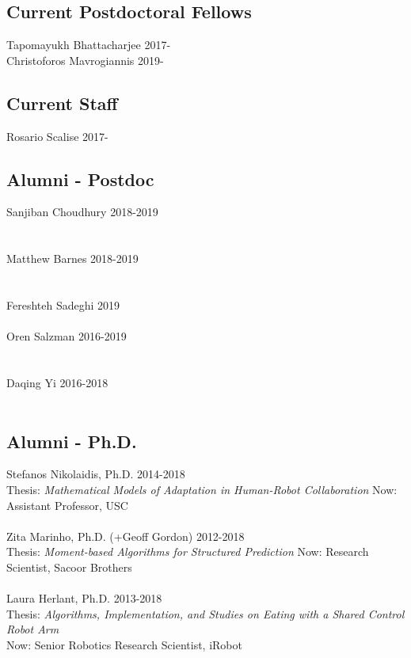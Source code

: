 \documentclass[10pt]{article}
\begin{document}
\subsection{Current Postdoctoral Fellows}
\vspace{-1em}
\noindent
Tapomayukh Bhattacharjee \hfill 2017-\\
Christoforos Mavrogiannis \hfill 2019-\\

\subsection{Current Staff}
\vspace{-1em}
\noindent
Rosario Scalise \hfill 2017-\\

\subsection{Alumni - Postdoc}
\vspace{-1em}
\noindent
Sanjiban Choudhury \hfill 2018-2019\\
\\
\\
Matthew Barnes \hfill 2018-2019\\
\\
\\
Fereshteh Sadeghi \hfill 2019\\
\\
Oren Salzman \hfill 2016-2019\\
\\
\\
Daqing Yi \hfill 2016-2018\\
\\

\subsection{Alumni - Ph.D.}
\noindent
Stefanos Nikolaidis, Ph.D. \hfill 2014-2018\\
Thesis: \textit{Mathematical Models of Adaptation in Human-Robot Collaboration} \hfill
Now: Assistant Professor, USC\\
\\
Zita Marinho, Ph.D. (+Geoff Gordon) \hfill 2012-2018\\
Thesis: \textit{Moment-based Algorithms for Structured Prediction}\hfill
Now: Research Scientist, Sacoor Brothers\\
\\
Laura Herlant, Ph.D. \hfill 2013-2018\\
Thesis: \textit{Algorithms, Implementation, and Studies on Eating with a Shared Control Robot Arm}
\\
\phantom{a}\hfill Now: Senior Robotics Research Scientist, iRobot\\
\end{document}
